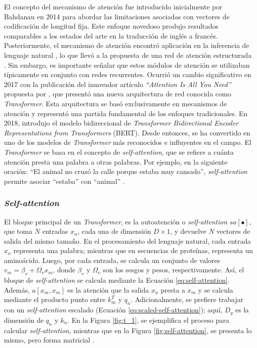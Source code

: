 El concepto del mecanismo de atención fue introducido inicialmente por Bahdanau en 2014 \citep{bahdanau2014neural} para abordar las limitaciones asociadas con vectores de codificación de longitud fija. Este enfoque novedoso produjo resultados comparables a los estados del arte en la traducción de inglés a francés. Posteriormente, el mecanismo de atención encontró aplicación en la inferencia de lenguaje natural \citep{parikh2016decomposable}, lo que llevó a la propuesta de una red de atención estructurada \citep{kim2017structured}. Sin embargo, es importante señalar que estos módulos de atención se utilizaban típicamente en conjunto con redes recurrentes. Ocurrió un cambio significativo en 2017 con la publicación del innovador artículo \textit{``Attention Is All You Need''} propuesta por \cite{vaswani2017attention}, que presentó una nueva arquitectura de red conocida como \textit{Transformer}. Esta arquitectura se basó exclusivamente en mecanismos de atención y representó una partida fundamental de los enfoques tradicionales. En 2018, \cite{devlin2018bert} introdujo el modelo bidireccional de \textit{Transformer Bidirectional Encoder Representations from Transformers} (BERT). Desde entonces, se ha convertido en uno de los modelos de \textit{Transformer} más reconocidos e influyentes en el campo. El \textit{Transformer} se basa en el concepto de \textit{self-attention}, que se refiere a cuánta atención presta una palabra a otras palabras. Por ejemplo, en la siguiente oración: ``El animal no cruzó la calle porque estaba muy cansado'', \textit{self-attention} permite asociar ``estaba'' con ``animal'' \citep{prince2023understanding}.

\subsubsection{\textit{Self-attention}}

El bloque principal de un \textit{Transformer}, es la autoatención o \textit{self-attention} $sa[\bullet]$, que toma $N$ entradas $x_n$, cada una de dimensión $D \times 1$, y devuelve $N$ vectores de salida del mismo tamaño. En el procesamiento del lenguaje natural, cada entrada $x_n$ representa una palabra; mientras que en secuencias de proteínas, representa un aminoácido. Luego, por cada entrada, se calcula un conjunto de valores $v_m = \beta_v + \Omega_vx_m$, donde $\beta_v$ y $\Omega_v$ son los sesgos y pesos, respectivamente. Así, el bloque de \textit{self-attention} se calcula mediante la Ecuación \ref{eq:self-attention}. Además, $a[x_m, x_m]$ es la atención que la salida $x_n$ presta a $x_m$ y se calcula mediante el producto punto entre $k_m^T$ y $q_n$. Adicionalmente, se prefiere trabajar con un \textit{self-attention}  escalado (Ecuación \ref{eq:scaled-self-attention}); aquí, $D_q$ es la dimensión de $q_n$ y $k_n$. En la Figura \ref{fig:t_1}, se ejemplifica el proceso para calcular \textit{self-attention}, mientras que en la Figura \ref{fig:self-attention}, se presenta lo mismo, pero forma matricial \citep{prince2023understanding}.


